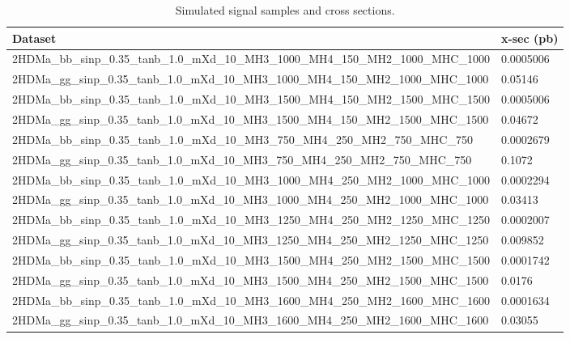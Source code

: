 \begin{table}
    \label{tab:backgrounds}
\end{table}

\begin{table}
    \caption{Simulated signal samples and cross sections.}
    \begin{center}
    \begin{adjustbox}{width=\textwidth}
    \begin{tabular}{|l|l|}
        \hline

        Dataset & x-sec (pb) \\ \hline
        2HDMa\_bb\_sinp\_0.35\_tanb\_1.0\_mXd\_10\_MH3\_1000\_MH4\_150\_MH2\_1000\_MHC\_1000 & 0.0005006   \\
        2HDMa\_gg\_sinp\_0.35\_tanb\_1.0\_mXd\_10\_MH3\_1000\_MH4\_150\_MH2\_1000\_MHC\_1000 & 0.05146     \\
        2HDMa\_bb\_sinp\_0.35\_tanb\_1.0\_mXd\_10\_MH3\_1500\_MH4\_150\_MH2\_1500\_MHC\_1500 & 0.0005006   \\
        2HDMa\_gg\_sinp\_0.35\_tanb\_1.0\_mXd\_10\_MH3\_1500\_MH4\_150\_MH2\_1500\_MHC\_1500 & 0.04672     \\
        2HDMa\_bb\_sinp\_0.35\_tanb\_1.0\_mXd\_10\_MH3\_750\_MH4\_250\_MH2\_750\_MHC\_750    & 0.0002679   \\
        2HDMa\_gg\_sinp\_0.35\_tanb\_1.0\_mXd\_10\_MH3\_750\_MH4\_250\_MH2\_750\_MHC\_750    & 0.1072      \\
        2HDMa\_bb\_sinp\_0.35\_tanb\_1.0\_mXd\_10\_MH3\_1000\_MH4\_250\_MH2\_1000\_MHC\_1000 & 0.0002294   \\
        2HDMa\_gg\_sinp\_0.35\_tanb\_1.0\_mXd\_10\_MH3\_1000\_MH4\_250\_MH2\_1000\_MHC\_1000 & 0.03413     \\
        2HDMa\_bb\_sinp\_0.35\_tanb\_1.0\_mXd\_10\_MH3\_1250\_MH4\_250\_MH2\_1250\_MHC\_1250 & 0.0002007   \\
        2HDMa\_gg\_sinp\_0.35\_tanb\_1.0\_mXd\_10\_MH3\_1250\_MH4\_250\_MH2\_1250\_MHC\_1250 & 0.009852    \\
        2HDMa\_bb\_sinp\_0.35\_tanb\_1.0\_mXd\_10\_MH3\_1500\_MH4\_250\_MH2\_1500\_MHC\_1500 & 0.0001742   \\
        2HDMa\_gg\_sinp\_0.35\_tanb\_1.0\_mXd\_10\_MH3\_1500\_MH4\_250\_MH2\_1500\_MHC\_1500 & 0.0176      \\
        2HDMa\_bb\_sinp\_0.35\_tanb\_1.0\_mXd\_10\_MH3\_1600\_MH4\_250\_MH2\_1600\_MHC\_1600 & 0.0001634   \\
        2HDMa\_gg\_sinp\_0.35\_tanb\_1.0\_mXd\_10\_MH3\_1600\_MH4\_250\_MH2\_1600\_MHC\_1600 & 0.03055     \\

\end{tabular}
\end{adjustbox}
\end{center}
\end{table}
